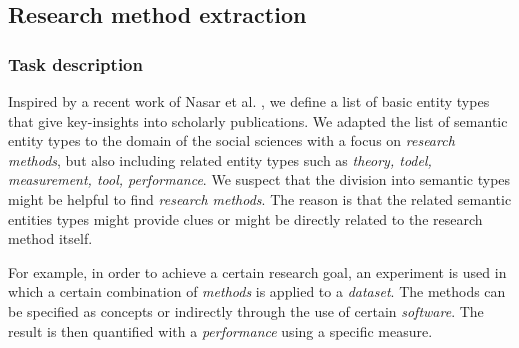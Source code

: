 \subsection{Research method extraction}
\label{sec:research_method_extraction}


\subsubsection{Task description}
Inspired by a recent work of Nasar et al. \cite{nasar2018information}, we define a list of basic entity types that give key-insights into scholarly publications. 
We adapted the list of semantic entity types to the domain of the social sciences with a focus on \textit{research methods},
but also including related entity types such as \textit{theory, todel, measurement, tool, performance}. We suspect that the division into semantic types might be helpful to find \textit{research methods}.
The reason is that the related semantic entities types might provide clues or might be directly related to the research method itself.

For example, in order to achieve a certain research goal, an experiment is used in which a certain combination of \textit{methods} is applied to a \textit{dataset}.
The methods can be specified as concepts or indirectly through the use of certain \textit{software}.
The result is then quantified with a \textit{performance} using a specific measure.

